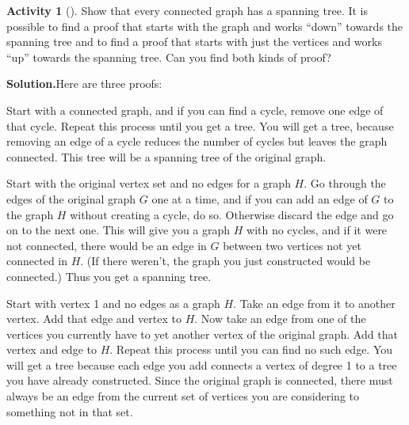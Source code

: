 \documentclass[10pt,]{book}
\theoremstyle{plain}
\theoremstyle{definition}
\newtheorem{activity}[project]{Activity}
\numberwithin{equation}{chapter}
\begin{document}
\begin{activity}[]\label{activity-56}
Show that every connected graph has a spanning tree. It is possible to find a proof that starts with the graph and works ``down'' towards the spanning tree and to find a proof that starts with just the vertices and works ``up'' towards the spanning tree. Can you find both kinds of proof?%
\par\medskip\noindent%
\textbf{Solution.}\quad Here are three proofs:%
\par
Start with a connected graph, and if you can find a cycle, remove one edge of that cycle. Repeat this process until you get a tree. You will get a tree, because removing an edge of a cycle reduces the number of cycles but leaves the graph connected. This tree will be a spanning tree of the original graph.%
\par
Start with the original vertex set and no edges for a graph \(H\). Go through the edges of the original graph \(G\) one at a time, and if you can add an edge of \(G\) to the graph \(H\) without creating a cycle, do so. Otherwise discard the edge and go on to the next one. This will give you a graph \(H\) with no cycles, and if it were not connected, there would be an edge in \(G\) between two vertices not yet connected in \(H\). (If there weren't, the graph you just constructed would be connected.) Thus you get a spanning tree.%
\par
Start with vertex 1 and no edges as a graph \(H\). Take an edge from it to another vertex. Add that edge and vertex to \(H\). Now take an edge from one of the vertices you currently have to yet another vertex of the original graph. Add that vertex and edge to \(H\). Repeat this process until you can find no such edge. You will get a tree because each edge you add connects a vertex of degree 1 to a tree you have already constructed. Since the original graph is connected, there must always be an edge from the current set of vertices you are considering to something not in that set.%
\end{activity}
\typeout{************************************************}
\typeout{************************************************}
\end{document}
